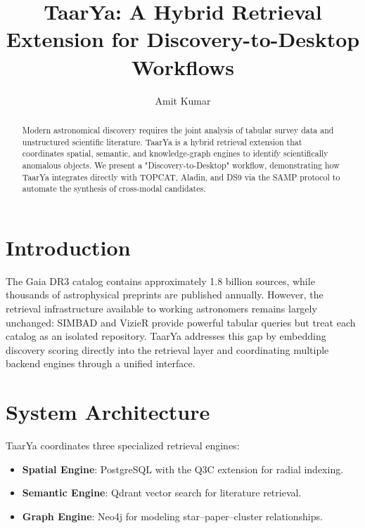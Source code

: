 \documentclass[11pt,twoside]{article}
\begin{document}
\title{TaarYa: A Hybrid Retrieval Extension for Discovery-to-Desktop Workflows}

\author{Amit Kumar}


\begin{abstract}
Modern astronomical discovery requires the joint analysis of tabular survey data and unstructured scientific literature. TaarYa is a hybrid retrieval extension that coordinates spatial, semantic, and knowledge-graph engines to identify scientifically anomalous objects. We present a "Discovery-to-Desktop" workflow, demonstrating how TaarYa integrates directly with TOPCAT, Aladin, and DS9 via the SAMP protocol to automate the synthesis of cross-modal candidates.
\end{abstract}

\section{Introduction}

The Gaia DR3 catalog contains approximately 1.8 billion sources, while thousands of astrophysical preprints are published annually. However, the retrieval infrastructure available to working astronomers remains largely unchanged: SIMBAD and VizieR provide powerful tabular queries but treat each catalog as an isolated repository. TaarYa addresses this gap by embedding discovery scoring directly into the retrieval layer and coordinating multiple backend engines through a unified interface.

\section{System Architecture}

TaarYa coordinates three specialized retrieval engines:
\begin{itemize}
    \item \textbf{Spatial Engine}: PostgreSQL with the Q3C extension for radial indexing.
    \item \textbf{Semantic Engine}: Qdrant vector search for literature retrieval.
    \item \textbf{Graph Engine}: Neo4j for modeling star--paper--cluster relationships.
\end{itemize}
\end{document}
